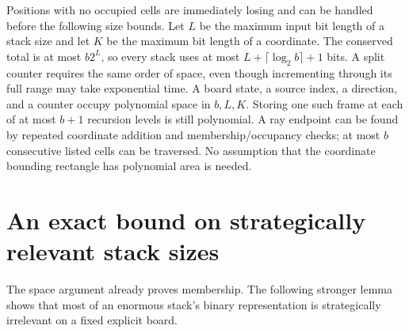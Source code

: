 \documentclass[11pt]{article}
\begin{document}
Positions with no occupied cells are immediately losing and can be
handled before the following size bounds. Let $L$ be the maximum input
bit length of a stack size and let $K$ be the
maximum bit length of a coordinate. The conserved total is at most
$b2^L$, so every stack uses at most $L+\lceil\log_2 b\rceil+1$ bits.
A split counter requires the same order of space, even though incrementing
through its full range may take exponential time. A board state, a source
index, a direction, and a counter occupy polynomial space in $b,L,K$.
Storing one such frame at each of at most $b+1$ recursion levels is still
polynomial. A ray endpoint can be found by repeated coordinate addition
and membership/occupancy checks; at most $b$ consecutive listed cells can
be traversed. No assumption that the coordinate bounding rectangle has
polynomial area is needed.

\section*{An exact bound on strategically relevant stack sizes}
The space argument already proves membership. The following stronger
lemma shows that most of an enormous stack's binary representation is
strategically irrelevant on a fixed explicit board.
\end{document}
